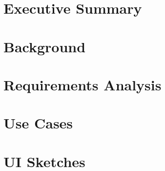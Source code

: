 





\newpage

\section{Executive Summary}



\section{Background}



\section{Requirements Analysis}







\appendix

\section{Use Cases}



\section{UI Sketches}




